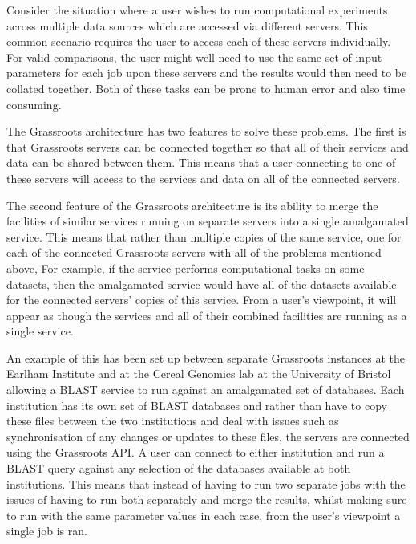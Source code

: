 \documentclass[12pt,a4paper]{extarticle}
\begin{document}
Consider the situation where a user wishes to run computational experiments across multiple data sources which are accessed via different servers. 
This common scenario requires the user to access each of these servers individually. 
For valid comparisons, the user might well need to use the same set of input parameters for each job upon these servers and the results would then need to be collated together. 
Both of these tasks can be prone to human error and also time consuming. 

The Grassroots architecture has two features to solve these problems. 
The first is that Grassroots servers can be connected together so that all of their services and data can be shared between them. 
This means that a user connecting to one of these servers will access to the services and data on all of the connected servers.

The second feature of the Grassroots architecture is its ability to merge the facilities of similar services running on separate servers into a single amalgamated service. 
This means that rather than multiple copies of the same service, one for each of the connected Grassroots servers with all of the problems mentioned above, 
For example, if the service performs computational tasks on some datasets, then the amalgamated service would have all of the datasets available for the connected servers' copies of this service.
From a user’s viewpoint, it will appear as though the services and all of their combined facilities are running as a single service. 

An example of this has been set up between separate Grassroots instances at the Earlham Institute and at the Cereal Genomics lab at the University of Bristol allowing a BLAST service to run against an amalgamated set of databases. 
Each institution has its own set of BLAST databases and rather than have to copy these files between the two institutions and deal with issues such as synchronisation of any changes or updates to these files, the servers are connected using the Grassroots API. 
A user can connect to either institution and run a BLAST query against any selection of the databases available at both institutions. 
This means that instead of having to run two separate jobs with the issues of having to run both separately and merge the results, whilst making sure to run with the same parameter values in each case, from the user's viewpoint a single job is ran.

\end{document}
